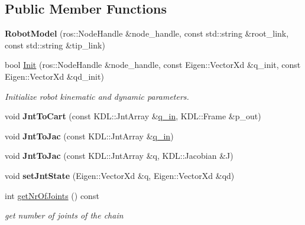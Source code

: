 \subsection*{Public Member Functions}
\begin{DoxyCompactItemize}
\item 
\mbox{\label{classrobot_1_1_robot_model_ac25d2fcf6e8794a15308c1281cb0e410}} 
{\bfseries Robot\+Model} (ros\+::\+Node\+Handle \&node\+\_\+handle, const std\+::string \&root\+\_\+link, const std\+::string \&tip\+\_\+link)
\item 
bool \hyperlink{classrobot_1_1_robot_model_a0398088779cef8797c8a0a8d51123e4d}{Init} (ros\+::\+Node\+Handle \&node\+\_\+handle, const Eigen\+::\+Vector\+Xd \&q\+\_\+init, const Eigen\+::\+Vector\+Xd \&qd\+\_\+init)
\begin{DoxyCompactList}\small\item\em Initialize robot kinematic and dynamic parameters. \end{DoxyCompactList}\item 
\mbox{\label{classrobot_1_1_robot_model_af0406f103a221b8f7a3115e91fff218b}} 
void {\bfseries Jnt\+To\+Cart} (const K\+D\+L\+::\+Jnt\+Array \&\hyperlink{classrobot_1_1_robot_model_a1556ddcb4f7966858761f2ddd5f37b77}{q\+\_\+in}, K\+D\+L\+::\+Frame \&p\+\_\+out)
\item 
\mbox{\label{classrobot_1_1_robot_model_abbb385d7c40ff1ec56d986da1f29da6d}} 
void {\bfseries Jnt\+To\+Jac} (const K\+D\+L\+::\+Jnt\+Array \&\hyperlink{classrobot_1_1_robot_model_a1556ddcb4f7966858761f2ddd5f37b77}{q\+\_\+in})
\item 
\mbox{\label{classrobot_1_1_robot_model_a53fb858c0b17569298628e15ea397abf}} 
void {\bfseries Jnt\+To\+Jac} (const K\+D\+L\+::\+Jnt\+Array \&q, K\+D\+L\+::\+Jacobian \&J)
\item 
\mbox{\label{classrobot_1_1_robot_model_a7cee109d48c4f3d5b3ff5d7d0f571317}} 
void {\bfseries set\+Jnt\+State} (Eigen\+::\+Vector\+Xd \&q, Eigen\+::\+Vector\+Xd \&qd)
\item 
int \hyperlink{classrobot_1_1_robot_model_a8c6f576c291acaaafa0f4caaac26e495}{get\+Nr\+Of\+Joints} () const
\begin{DoxyCompactList}\small\item\em get number of joints of the chain \end{DoxyCompactList}\item 

\end{DoxyCompactItemize}
